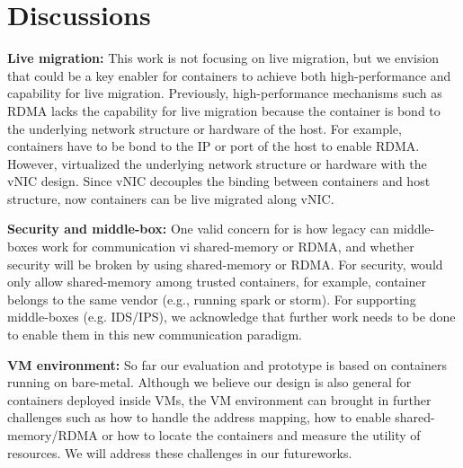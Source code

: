 \section{Discussions} \label{sec:discussion}


\textbf{Live migration:} 
This work is not focusing on live migration, but we envision that \sysname could be a key enabler
for containers to achieve both high-performance and capability for live migration.
Previously, high-performance mechanisms such as RDMA lacks the capability for live migration because
the container is bond to the underlying network structure or hardware of the host.
For example, containers have to be bond to the IP or port of the host to enable RDMA.
However, \sysname virtualized the underlying network structure or hardware with the vNIC design.
Since vNIC decouples the binding between containers and host structure, 
now containers can be live migrated along vNIC.

\textbf{Security and middle-box:}
One valid concern for \sysname is how legacy can middle-boxes work for communication
vi shared-memory or RDMA, and whether security will be broken by using shared-memory or RDMA.
For security, \sysname would only allow shared-memory among trusted containers, for example,
container belongs to the same vendor (e.g., running spark or storm).
For supporting middle-boxes (e.g. IDS/IPS), we acknowledge that further work needs to be done
to enable them in this new communication paradigm.


\textbf{VM environment:}
So far our evaluation and prototype is based on containers running on bare-metal. 
Although we believe our design is also general for containers deployed inside VMs,
the VM environment can brought in further challenges such as how to handle the
address mapping, how to enable shared-memory/RDMA or how to locate the containers
and measure the utility of resources. We will address these challenges in our futureworks.

